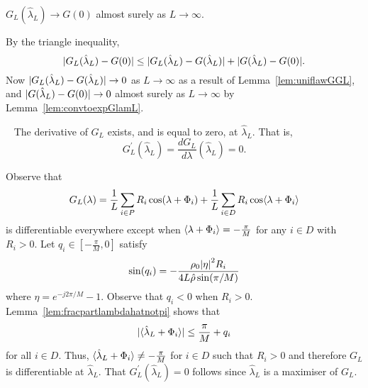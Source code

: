 \documentclass[journal]{IEEEtran}
\begin{document}
\begin{lemma}\label{lem:GLtoG0}
$G_L(\hat{\lambda}_L) \rightarrow G(0)$ almost surely as $L \rightarrow \infty$.
\end{lemma}
\begin{IEEEproof}
By the triangle inequality,
\[
{\vert G_L(\hat{\lambda}_L) - G(0) \vert} \leq {\vert G_L(\hat{\lambda}_L) - G(\hat{\lambda}_L) \vert} + {\vert G(\hat{\lambda}_L) - G(0) \vert}.
\]
Now ${\vert G_L(\hat{\lambda}_L) - G(\hat{\lambda}_L) \vert} \rightarrow 0$ as $L \rightarrow \infty$ as a result of Lemma~\ref{lem:uniflawGGL}, and ${\vert G(\hat{\lambda}_L) - G(0) \vert} \rightarrow 0$ almost surely as $L \rightarrow \infty$ by Lemma~\ref{lem:convtoexpGlamL}.
\end{IEEEproof}


\begin{lemma}~\label{lem:diffatlambdaL}
The derivative of $G_L$ exists, and is equal to zero, at $\hat{\lambda}_L$.  That is,
\[
G_L^\prime(\hat{\lambda}_L) = \frac{d G_L}{d \lambda}(\hat{\lambda}_L) = 0.
\]
\end{lemma}
\begin{IEEEproof}
Observe that 
\[
G_L(\lambda) = \frac{1}{L}\sum_{i \in P} R_i \cos(\lambda + \Phi_i) + \frac{1}{L} \sum_{i \in D} R_i \cos\langle \lambda + \Phi_i \rangle
\] 
is differentiable everywhere except when $\left\langle \lambda + \Phi_i \right\rangle = -\tfrac{\pi}{M}$ for any $i \in D$ with $R_i > 0$.  Let $q_i \in [-\tfrac{\pi}{M}, 0]$ satisfy
\[
 \sin(q_i) = -\frac{\rho_0 {\vert \eta \vert}^2 R_i}{4 L \hat{\rho} \sin(\pi/M)}
\]
where $\eta = e^{-j2\pi/M} - 1$.  Observe that $q_i < 0$ when $R_i > 0$.  Lemma~\ref{lem:fracpartlambdahatnotpi} shows that
\[
{\vert \langle \hat{\lambda}_L + \Phi_i \rangle \vert} \leq \frac{\pi}{M} + q_i
\]
for all $i \in D$.  Thus, $\langle \hat{\lambda}_L + \Phi_i \rangle \neq -\tfrac{\pi}{M}$ for $i \in D$ such that $R_i > 0$ and therefore $G_L$ is differentiable at $\hat{\lambda}_L$.  That $G_L^\prime(\hat{\lambda}_L) = 0$ follows since $\hat{\lambda}_L$ is a maximiser of $G_L$.
\end{IEEEproof}
\end{document}
